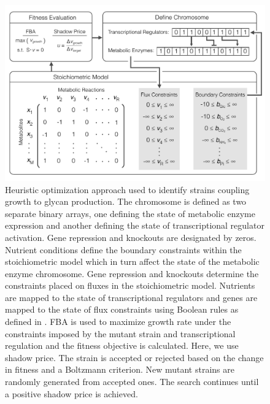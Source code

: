 \documentclass[12pt]{article}
\begin{document}
\clearpage

\begin{figure}\centering
\includegraphics[width=1.0\textwidth]{./figures/fig2_workflow.pdf}
\caption{Heuristic optimization approach used to identify strains coupling growth to glycan production. 
The chromosome is defined as two separate binary arrays, one defining the state of metabolic enzyme expression and another defining the state of transcriptional regulator activation. 
Gene repression and knockouts are designated by zeros. 
Nutrient conditions define the boundary constraints within the stoichiometric model which in turn affect the state of the metabolic enzyme chromosome. 
Gene repression and knockouts determine the constraints placed on fluxes in the stoichiometric model. 
Nutrients are mapped to the state of transcriptional regulators and genes are mapped to the state of flux constraints using Boolean rules as defined in \cite{2004_covert_reed_herrgard_palsson_Nat,2007_feist_reed_hatzimanikatis_palsson_MolSysBio}. 
FBA is used to maximize growth rate under the constraints imposed by the mutant strain and transcriptional regulation and the fitness objective is calculated. 
Here, we use shadow price. 
The strain is accepted or rejected based on the change in fitness and a Boltzmann criterion. 
New mutant strains are randomly generated from accepted ones. 
The search continues until a positive shadow price is achieved.}
\label{fig_workflow_heuristic}
\end{figure}

\clearpage
\end{document}
